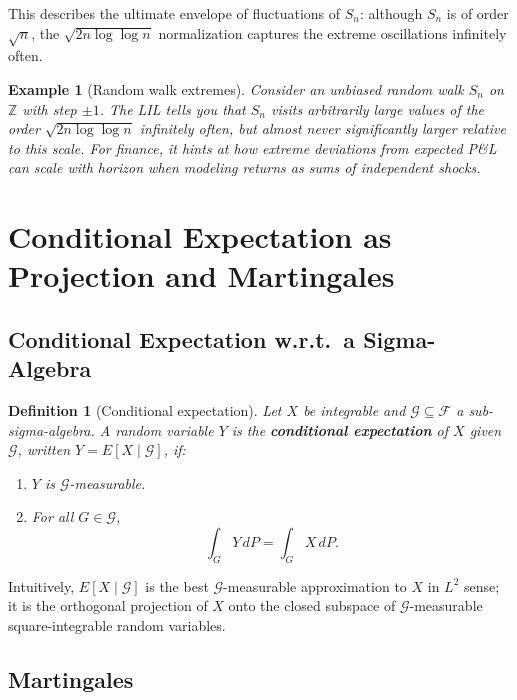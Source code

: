 \documentclass[11pt,a4paper]{article}
\newtheorem{definition}{Definition}[section]
\newtheorem{example}{Example}[section]
\numberwithin{equation}{section}
\begin{document}
This describes the ultimate envelope of fluctuations of $S_n$: although $S_n$ is of order $\sqrt{n}$, the $\sqrt{2n\log\log n}$ normalization captures the extreme oscillations infinitely often.

\begin{example}[Random walk extremes]
Consider an unbiased random walk $S_n$ on $\mathbb{Z}$ with step $\pm 1$. 
The LIL tells you that $S_n$ visits arbitrarily large values of the order $\sqrt{2n\log\log n}$ infinitely often, but almost never significantly larger relative to this scale. 
For finance, it hints at how extreme deviations from expected P\&L can scale with horizon when modeling returns as sums of independent shocks.

\end{example}

\newpage

\section{Conditional Expectation as Projection and Martingales}
\label{sec:martingales}

\subsection{Conditional Expectation w.r.t.\ a Sigma-Algebra}

\begin{definition}[Conditional expectation]
Let $X$ be integrable and $\mathcal{G} \subseteq \mathcal{F}$ a sub-sigma-algebra. 
A random variable $Y$ is the \textbf{conditional expectation} of $X$ given $\mathcal{G}$, written $Y = E[X \mid \mathcal{G}]$, if:
\begin{enumerate}[label=(\roman*)]
    \item $Y$ is $\mathcal{G}$-measurable.
    \item For all $G \in \mathcal{G}$,
    \[
    \int_G Y\,dP = \int_G X\,dP.
    \]
\end{enumerate}
\end{definition}

Intuitively, $E[X \mid \mathcal{G}]$ is the best $\mathcal{G}$-measurable approximation to $X$ in $L^2$ sense; it is the orthogonal projection of $X$ onto the closed subspace of $\mathcal{G}$-measurable square-integrable random variables.

\subsection{Martingales}
\end{document}
